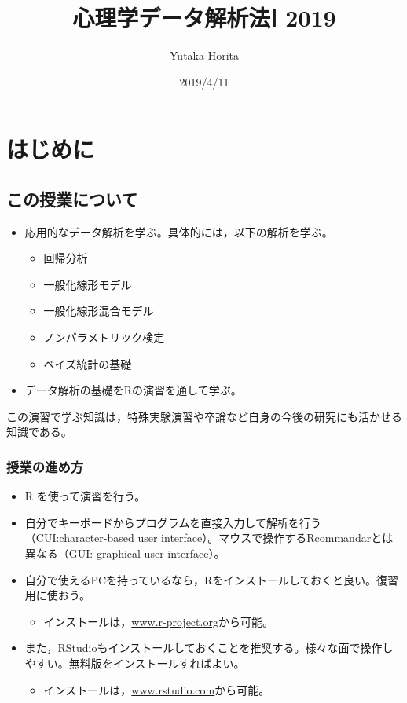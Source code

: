\documentclass[]{article}
\title{心理学データ解析法Ⅰ 2019}
\author{Yutaka Horita}
\date{2019/4/11}
\providecommand{\tightlist}{%
  \setlength{\itemsep}{0pt}\setlength{\parskip}{0pt}}
\begin{document}
\maketitle

{
\setcounter{tocdepth}{2}
\tableofcontents
}
\section*{はじめに}

\subsection{この授業について}

\begin{itemize}
\tightlist
\item
  応用的なデータ解析を学ぶ。具体的には，以下の解析を学ぶ。

  \begin{itemize}
  \tightlist
  \item
    回帰分析
  \item
    一般化線形モデル
  \item
    一般化線形混合モデル
  \item
    ノンパラメトリック検定
  \item
    ベイズ統計の基礎
  \end{itemize}
\item
  データ解析の基礎をRの演習を通して学ぶ。
\end{itemize}

この演習で学ぶ知識は，特殊実験演習や卒論など自身の今後の研究にも活かせる知識である。

\subsubsection{授業の進め方}

\begin{itemize}
\tightlist
\item
  R を使って演習を行う。
\item
  自分でキーボードからプログラムを直接入力して解析を行う（CUI:character-based
  user interface）。マウスで操作するRcommandarとは異なる（GUI: graphical
  user interface）。
\item
  自分で使えるPCを持っているなら，Rをインストールしておくと良い。復習用に使おう。

  \begin{itemize}
  \tightlist
  \item
    インストールは，\href{https://www.r-project.org}{www.r-project.org}から可能。
  \end{itemize}
\item
  また，RStudioもインストールしておくことを推奨する。様々な面で操作しやすい。無料版をインストールすればよい。

  \begin{itemize}
  \tightlist
  \item
    インストールは，\href{https://www.rstudio.com}{www.rstudio.com}から可能。
  \end{itemize}
\end{itemize}
\end{document}
